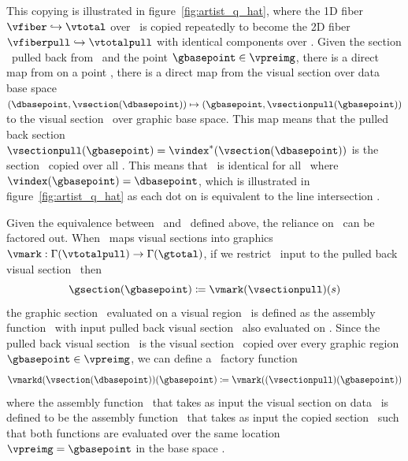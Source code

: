 \documentclass[../main.tex]{subfiles}
\begin{document}
This copying is illustrated in figure~\ref{fig:artist_q_hat}, where the 1D fiber $\vfiber \hookrightarrow \vtotal$ over \dbase\ is copied repeatedly to become the 2D fiber $\vfiberpull \hookrightarrow \vtotalpull$ with identical components over \gbase. Given the section \vsectionpull\ pulled back from \vsection\ and the point $\gbasepoint \in \vpreimg$, there is a direct map from \vsection on a point \dbasepoint, there is a direct map from the visual section over data base space  $(\dbasepoint, \vsection(\dbasepoint)) \mapsto (\gbasepoint, \vsectionpull(\gbasepoint))$ to the visual section \vsectionpull\ over graphic base space. This map means that the pulled back section $\vsectionpull(\gbasepoint) = \vindex^*(\vsection(\dbasepoint))$ is the section \vsection\ copied over all \gbasepoint. This means that \vsectionpull\ is identical for all \gbasepoint\ where $\vindex(\gbasepoint) = \dbasepoint$, which is illustrated in figure~\ref{fig:artist_q_hat} as each dot on \vfiber is equivalent to the line intersection \vfiberpull. 

Given the equivalence between \vsection\ and \vsectionpull\ defined above, the reliance on \gbase\ can be factored out. When \vmark\ maps visual sections  into graphics $\vmark: \Gamma(\vtotalpull) \rightarrow \Gamma(\gtotal)$, if we restrict \vmark\ input to the pulled back visual section \vsectionpull\ then 
\begin{equation}
    \gsection(\gbasepoint) \coloneqq \vmark(\vsectionpull)(s)
\end{equation}
the graphic section \gsection\ evaluated on a visual region \gbasepoint\ is defined as the assembly function \vmark\ with input pulled back visual section \vsectionpull\ also evaluated on \gbasepoint. Since the pulled back visual section \vsectionpull\ is the visual section \vsection\ copied over every graphic region $\gbasepoint \in \vpreimg$, we can define a \vmark\ factory function 
\begin{equation}
\label{eq:qhat_q_s}
\vmarkd(\vsection(\dbasepoint))(\gbasepoint) \coloneqq \vmark((\vsectionpull)(\gbasepoint))
\end{equation} 
where the assembly function \vmarkd\ that takes as input the visual section on data \vsection\ is defined to be the assembly function \vmark\ that takes as input the copied section \vsectionpull\ such that both functions are evaluated over the same location $\vpreimg = \gbasepoint$ in the base space \gbase. 
\end{document}
